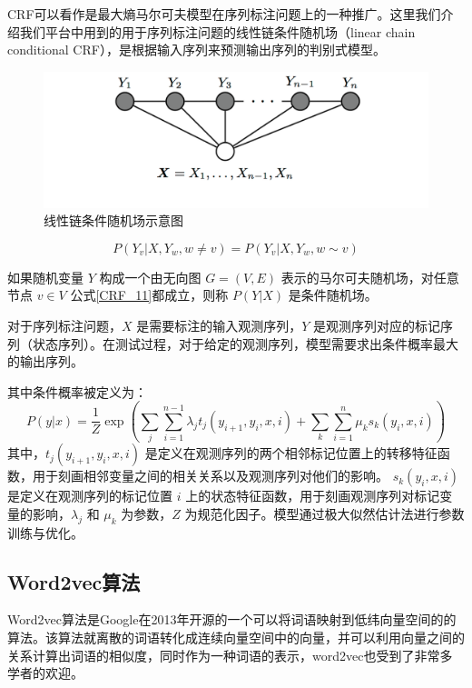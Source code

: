 CRF可以看作是最大熵马尔可夫模型在序列标注问题上的一种推广。这里我们介绍我们平台中用到的用于序列标注问题的线性链条件随机场（linear chain conditional CRF），是根据输入序列来预测输出序列的判别式模型。
	\begin{figure}[ht]
		\centering
		\includegraphics[width=\linewidth]{figures/linear_chain_CRF.png}
		\caption{线性链条件随机场示意图}
    	\label{fig:Markov3}
	\end{figure}

\begin{equation}
P\left(Y_{v} | X, Y_{w}, w \neq v\right)=P\left(Y_{v} | X, Y_{w}, w \sim v\right)
\label{CRF_11}
\end{equation}

如果随机变量 $Y$ 构成一个由无向图 $G=(V, E)$ 表示的马尔可夫随机场，对任意节点 $v \in V$ 公式\ref{CRF_11}都成立，则称 $P(Y|X)$ 是条件随机场。

对于序列标注问题，$X$ 是需要标注的输入观测序列，$Y$ 是观测序列对应的标记序列（状态序列）。在测试过程，对于给定的观测序列，模型需要求出条件概率最大的输出序列。

其中条件概率被定义为：
	\begin{equation}
P(y | x)=\frac{1}{Z} \exp \left(\sum_{j} \sum_{i=1}^{n-1} \lambda_{j} t_{j}\left(y_{i+1}, y_{i}, x, i\right)+\sum_{k} \sum_{i=1}^{n} \mu_{k} s_{k}\left(y_{i}, x, i\right)\right)
\end{equation}
其中，$t_j(y_{i+1}, y_i, x, i)$ 是定义在观测序列的两个相邻标记位置上的转移特征函数，用于刻画相邻变量之间的相关关系以及观测序列对他们的影响。 $s_k(y_i, x, i)$ 是定义在观测序列的标记位置 $i$ 上的状态特征函数，用于刻画观测序列对标记变量的影响，$\lambda_j$ 和 $\mu_k$ 为参数，$Z$ 为规范化因子。模型通过极大似然估计法进行参数训练与优化。

\subsection{Word2vec算法}
Word2vec算法是Google在2013年开源的一个可以将词语映射到低纬向量空间的的算法。该算法就离散的词语转化成连续向量空间中的向量，并可以利用向量之间的关系计算出词语的相似度，同时作为一种词语的表示，word2vec也受到了非常多学者的欢迎。

